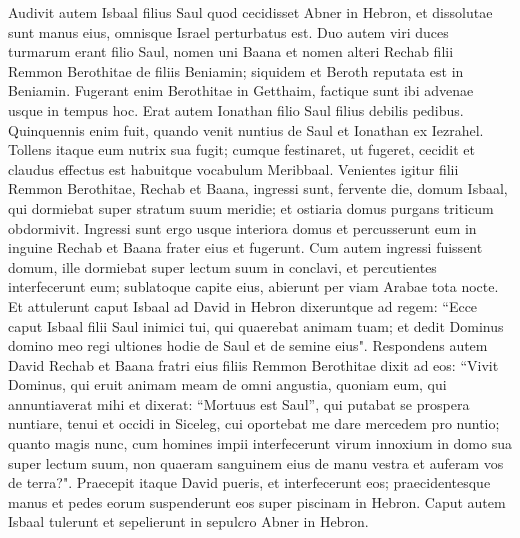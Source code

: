 \begin{biblechapter}  
\verse Audivit autem Isbaal filius Saul quod cecidisset Abner in Hebron, et dissolutae sunt manus eius, omnisque Israel perturbatus est. 
\verse Duo autem viri duces turmarum erant filio Saul, nomen uni Baana et nomen alteri Rechab filii Remmon Berothitae de filiis Beniamin; siquidem et Beroth reputata est in Beniamin. 
\verse Fugerant enim Berothitae in Getthaim, factique sunt ibi advenae usque in tempus hoc. 
\verse Erat autem Ionathan filio Saul filius debilis pedibus. Quinquennis enim fuit, quando venit nuntius de Saul et Ionathan ex Iezrahel. Tollens itaque eum nutrix sua fugit; cumque festinaret, ut fugeret, cecidit et claudus effectus est habuitque vocabulum Meribbaal. 
\verse Venientes igitur filii Remmon Berothitae, Rechab et Baana, ingressi sunt, fervente die, domum Isbaal, qui dormiebat super stratum suum meridie; et ostiaria domus purgans triticum obdormivit. 
\verse Ingressi sunt ergo usque interiora domus et percusserunt eum in inguine Rechab et Baana frater eius et fugerunt. 
\verse Cum autem ingressi fuissent domum, ille dormiebat super lectum suum in conclavi, et percutientes interfecerunt eum; sublatoque capite eius, abierunt per viam Arabae tota nocte. 
\verse Et attulerunt caput Isbaal ad David in Hebron dixeruntque ad regem: “Ecce caput Isbaal filii Saul inimici tui, qui quaerebat animam tuam; et dedit Dominus domino meo regi ultiones hodie de Saul et de semine eius". 
\verse Respondens autem David Rechab et Baana fratri eius filiis Remmon Berothitae dixit ad eos: “Vivit Dominus, qui eruit animam meam de omni angustia, 
\verse quoniam eum, qui annuntiaverat mihi et dixerat: “Mortuus est Saul”, qui putabat se prospera nuntiare, tenui et occidi in Siceleg, cui oportebat me dare mercedem pro nuntio; 
\verse quanto magis nunc, cum homines impii interfecerunt virum innoxium in domo sua super lectum suum, non quaeram sanguinem eius de manu vestra et auferam vos de terra?". 
\verse Praecepit itaque David pueris, et interfecerunt eos; praecidentesque manus et pedes eorum suspenderunt eos super piscinam in Hebron. Caput autem Isbaal tulerunt et sepelierunt in sepulcro Abner in Hebron. 
\end{biblechapter}

